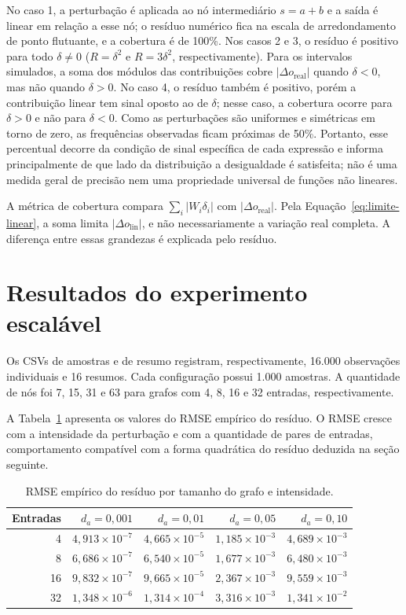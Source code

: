 \documentclass[12pt,openright,oneside,a4paper,brazil]{abntex2}
\newcommand{\e}[1]{\times 10^{#1}}
\begin{document}
No caso 1, a perturbação é aplicada ao nó intermediário $s=a+b$ e a saída é linear em relação a esse nó; o resíduo numérico fica na escala de arredondamento de ponto flutuante, e a cobertura é de 100\%. Nos casos 2 e 3, o resíduo é positivo para todo $\delta\ne0$ ($R=\delta^2$ e $R=3\delta^2$, respectivamente). Para os intervalos simulados, a soma dos módulos das contribuições cobre $|\Delta o_{\mathrm{real}}|$ quando $\delta<0$, mas não quando $\delta>0$. No caso 4, o resíduo também é positivo, porém a contribuição linear tem sinal oposto ao de $\delta$; nesse caso, a cobertura ocorre para $\delta>0$ e não para $\delta<0$. Como as perturbações são uniformes e simétricas em torno de zero, as frequências observadas ficam próximas de 50\%. Portanto, esse percentual decorre da condição de sinal específica de cada expressão e informa principalmente de que lado da distribuição a desigualdade é satisfeita; não é uma medida geral de precisão nem uma propriedade universal de funções não lineares.

A métrica de cobertura compara $\sum_i |W_i\delta_i|$ com $|\Delta o_{\mathrm{real}}|$. Pela Equação~\ref{eq:limite-linear}, a soma limita $|\Delta o_{\mathrm{lin}}|$, e não necessariamente a variação real completa. A diferença entre essas grandezas é explicada pelo resíduo.

\section{Resultados do experimento escalável}
Os CSVs de amostras e de resumo registram, respectivamente, 16.000 observações individuais e 16 resumos. Cada configuração possui 1.000 amostras. A quantidade de nós foi 7, 15, 31 e 63 para grafos com 4, 8, 16 e 32 entradas, respectivamente.

A Tabela~\ref{tab:rmse} apresenta os valores do RMSE empírico do resíduo. O RMSE cresce com a intensidade da perturbação e com a quantidade de pares de entradas, comportamento compatível com a forma quadrática do resíduo deduzida na seção seguinte.
\begin{table}[H]
\centering
\small
\caption{RMSE empírico do resíduo por tamanho do grafo e intensidade.}
\label{tab:rmse}
\begin{tabular}{r r r r r}
\toprule
Entradas & $d_a=0{,}001$ & $d_a=0{,}01$ & $d_a=0{,}05$ & $d_a=0{,}10$\\
\midrule
4 & $4{,}913\e{-7}$ & $4{,}665\e{-5}$ & $1{,}185\e{-3}$ & $4{,}689\e{-3}$\\
8 & $6{,}686\e{-7}$ & $6{,}540\e{-5}$ & $1{,}677\e{-3}$ & $6{,}480\e{-3}$\\
16 & $9{,}832\e{-7}$ & $9{,}665\e{-5}$ & $2{,}367\e{-3}$ & $9{,}559\e{-3}$\\
32 & $1{,}348\e{-6}$ & $1{,}314\e{-4}$ & $3{,}316\e{-3}$ & $1{,}341\e{-2}$\\
\bottomrule
\end{tabular}
\end{table}
\end{document}

